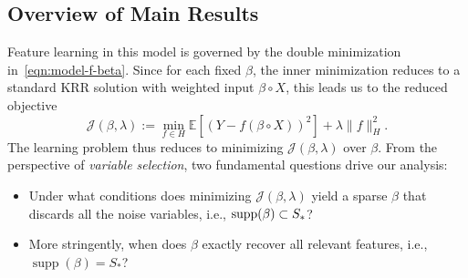 \documentclass[sn-mathphys-num]{sn-jnl}%
\numberwithin{equation}{section}
\newcommand{\E}{\mathbb{E}}
\renewcommand{\P}{\mathbb{P}}
\newcommand{\supp}{\mathop{\rm supp}}
\theoremstyle{thmstyleone}%
\theoremstyle{thmstyletwo}%
\theoremstyle{thmstylethree}%
\begin{document}
\subsection{Overview of Main Results} 
\label{sec:overview-of-main-results}
Feature learning in this model is governed by the double minimization in~\eqref{eqn:model-f-beta}. 
Since for each fixed $\beta$, the inner minimization reduces to a standard KRR solution with weighted 
input $\beta \circ X$, this leads us to the reduced objective 
\begin{equation}
\mathcal{J}(\beta,\lambda) := \min_{f \in H} \E\!\left[(Y - f(\beta \circ X))^2\right] + \lambda \|f\|_H^2.
\end{equation}
The learning problem thus reduces to minimizing $\mathcal{J}(\beta,\lambda)$ over $\beta$. 
From the perspective of \emph{variable selection}, two fundamental questions drive our analysis:

\vspace{.5em} 
\begin{itemize}
\item[$\mathsf{(P1)}$] Under what conditions does minimizing $\mathcal{J}(\beta, \lambda)$ yield a sparse $\beta$ that discards all the noise variables, i.e., $\supp(\beta) \subset S_*$?
\item[$\mathsf{(P2)}$] More stringently, when does $\beta$ exactly recover all relevant features, i.e., $\operatorname{supp}(\beta) = S_*$?
\end{itemize} 
\vspace{.5em}

\end{document}
